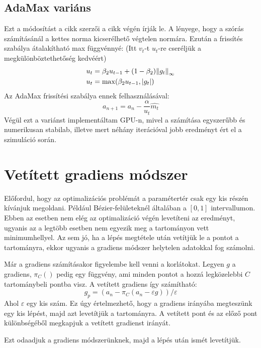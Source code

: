 \subsection{AdaMax variáns}
Ezt a módosítást a cikk \cite{Adam} szerzői a cikk végén írják le. A lényege, hogy a szórás számításánál a kettes norma kicserélhető végtelen normára. Ezután a frissítés szabálya átalakítható max függvénnyé: (Itt $v_t$-t $u_t$-re cseréljük a megkülönböztethetőség kedvéért)
\begin{align*} 
	u_t &= \beta_2 u_{t-1} + (1-\beta_2)\norm{g_t}_\infty \\ 
	u_t &= \max (\beta_2 u_{t-1}, |g_t|)
\end{align*}
Az AdaMax frissítési szabálya ennek felhasználásával:
$$ a_{n+1} = a_n - \frac{\alpha}{u_t}\hat{m_t} $$
Végül ezt a variánst implementáltam GPU-n, mivel a számítása egyszerűbb és numerikusan stabilab, illetve mert néhány iterációval jobb eredményt ért el a szimuláció során. 


\section{Vetített gradiens módszer}

Előfordul, hogy az optimalizációs problémát a paramétertér csak egy kis részén kívánjuk megoldani. Például Bézier-felületeknél általában a $[0,1]$ intervallumon. Ebben az esetben nem elég az optimalizáció végén levetíteni az eredményt, ugyanis az a legtöbb esetben nem egyezik meg a tartományon vett minimumhellyel. \cite{MirrorDescent} Az sem jó, ha a lépés megtétele után vetítjük le a pontot a tartományra, ekkor ugyanis a gradiens módszer helytelen adatokkal fog számolni. 

Már a gradiens számításakor figyelembe kell venni a korlátokat. Legyen $g$ a gradiens, $\pi_C()$ pedig egy függvény, ami minden pontot a hozzá legközelebbi $C$ tartománybeli pontba visz. A vetített gradiens így számítható:
$$ g_p = (a_n - \pi_C(a_n-\varepsilon g))/\varepsilon $$
Ahol $\varepsilon$ egy kis szám. Ez úgy értelmezhető, hogy a gradiens irányába megteszünk egy kis lépést, majd azt levetítjük a tartományra. A vetített pont és az előző pont különbségéből megkapjuk a vetített gradienst irányát.

Ezt odaadjuk a gradiens módszerünknek, majd a lépés után ismét levetítjük. 
